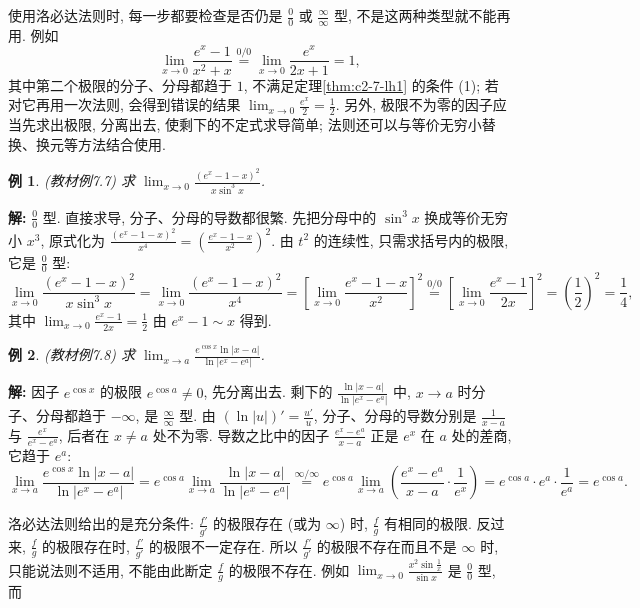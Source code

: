\documentclass[UTF8,openany]{ctexbook}
\theoremstyle{chinesetextbook}
\newtheorem{example}{例}[section]
\newenvironment{cnsolution}{\par\indent\textbf{解:} \ignorespaces}{\par}
\begin{document}
使用洛必达法则时, 每一步都要检查是否仍是 $\displaystyle\frac00$ 或 $\displaystyle\frac\infty\infty$ 型, 不是这两种类型就不能再用. 例如
\[
\lim_{x\to0}\frac{e^x-1}{x^2+x}\overset{0/0}{=}\lim_{x\to0}\frac{e^x}{2x+1}=1,
\]
其中第二个极限的分子、分母都趋于 $1$, 不满足定理\ref{thm:c2-7-lh1} 的条件 (1); 若对它再用一次法则, 会得到错误的结果 $\displaystyle\lim_{x\to0}\frac{e^x}2=\frac12$. 另外, 极限不为零的因子应当先求出极限, 分离出去, 使剩下的不定式求导简单; 法则还可以与等价无穷小替换、换元等方法结合使用.
\begin{example}\label{ex:c2-7-7}
\textnormal{(教材例7.7)} 求 $\displaystyle\lim_{x\to0}\frac{(e^x-1-x)^2}{x\sin^3x}$.
\end{example}
\begin{cnsolution}
$\displaystyle\frac00$ 型. 直接求导, 分子、分母的导数都很繁. 先把分母中的 $\sin^3x$ 换成等价无穷小 $x^3$, 原式化为 $\displaystyle\frac{(e^x-1-x)^2}{x^4}=\left(\frac{e^x-1-x}{x^2}\right)^2$. 由 $t^2$ 的连续性, 只需求括号内的极限, 它是 $\displaystyle\frac00$ 型:
\[
\lim_{x\to0}\frac{(e^x-1-x)^2}{x\sin^3x}=\lim_{x\to0}\frac{(e^x-1-x)^2}{x^4}=\left[\lim_{x\to0}\frac{e^x-1-x}{x^2}\right]^2\overset{0/0}{=}\left[\lim_{x\to0}\frac{e^x-1}{2x}\right]^2=\left(\frac12\right)^2=\frac14,
\]
其中 $\displaystyle\lim_{x\to0}\frac{e^x-1}{2x}=\frac12$ 由 $e^x-1\sim x$ 得到.
\end{cnsolution}
\begin{example}\label{ex:c2-7-8}
\textnormal{(教材例7.8)} 求 $\displaystyle\lim_{x\to a}\frac{e^{\cos x}\ln|x-a|}{\ln|e^x-e^a|}$.
\end{example}
\begin{cnsolution}
因子 $e^{\cos x}$ 的极限 $e^{\cos a}\ne0$, 先分离出去. 剩下的 $\displaystyle\frac{\ln|x-a|}{\ln|e^x-e^a|}$ 中, $x\to a$ 时分子、分母都趋于 $-\infty$, 是 $\displaystyle\frac\infty\infty$ 型. 由 $\displaystyle(\ln|u|)'=\frac{u'}u$, 分子、分母的导数分别是 $\displaystyle\frac1{x-a}$ 与 $\displaystyle\frac{e^x}{e^x-e^a}$, 后者在 $x\ne a$ 处不为零. 导数之比中的因子 $\displaystyle\frac{e^x-e^a}{x-a}$ 正是 $e^x$ 在 $a$ 处的差商, 它趋于 $e^a$:
\[
\lim_{x\to a}\frac{e^{\cos x}\ln|x-a|}{\ln|e^x-e^a|}=e^{\cos a}\lim_{x\to a}\frac{\ln|x-a|}{\ln|e^x-e^a|}\overset{\infty/\infty}{=}e^{\cos a}\lim_{x\to a}\left(\frac{e^x-e^a}{x-a}\cdot\frac1{e^x}\right)=e^{\cos a}\cdot e^a\cdot\frac1{e^a}=e^{\cos a}.
\]
\end{cnsolution}
洛必达法则给出的是充分条件: $\displaystyle\frac{f'}{g'}$ 的极限存在 (或为 $\infty$) 时, $\displaystyle\frac fg$ 有相同的极限. 反过来, $\displaystyle\frac fg$ 的极限存在时, $\displaystyle\frac{f'}{g'}$ 的极限不一定存在. 所以 $\displaystyle\frac{f'}{g'}$ 的极限不存在而且不是 $\infty$ 时, 只能说法则不适用, 不能由此断定 $\displaystyle\frac fg$ 的极限不存在. 例如 $\displaystyle\lim_{x\to0}\frac{x^2\sin\frac1x}{\sin x}$ 是 $\displaystyle\frac00$ 型, 而
\end{document}
